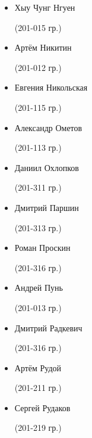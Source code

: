 \begin{multicols}{2}
\begin{small}
\begin{itemize}[leftmargin=0.5em]
	\item[] Хыу Чунг Нгуен\begin{tiny} (201-015 гр.)\end{tiny} %
	\item[] Артём Никитин\begin{tiny} (201-012 гр.)\end{tiny}
	\item[] Евгения Никольская\begin{tiny} (201-115 гр.)\end{tiny} %

	\item[] Александр Ометов\begin{tiny} (201-113 гр.)\end{tiny} %
	\item[] Даниил Охлопков\begin{tiny} (201-311 гр.)\end{tiny}

	\item[] Дмитрий Паршин\begin{tiny} (201-313 гр.)\end{tiny} %
	\item[] Роман Проскин\begin{tiny} (201-316 гр.)\end{tiny} %
	\item[] Андрей Пунь\begin{tiny} (201-013 гр.)\end{tiny}

	\item[] Дмитрий Радкевич\begin{tiny} (201-316 гр.)\end{tiny} %
	\item[] Артём Рудой\begin{tiny} (201-211 гр.)\end{tiny} %
	\item[] Сергей Рудаков\begin{tiny} (201-219 гр.)\end{tiny} %


\end{itemize}
\end{small}
\end{multicols}
